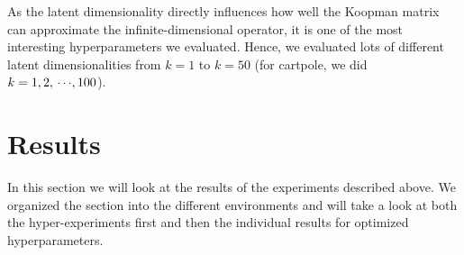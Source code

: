 			As the latent dimensionality directly influences how well the Koopman matrix can approximate the infinite-dimensional operator, it is one of the most interesting hyperparameters we evaluated. Hence, we evaluated lots of different latent dimensionalities from \( k = 1 \) to \( k = 50 \) (for cartpole, we did \( k = 1, 2, \,\cdots\!, 100 \)).

\section{Results}
	\label{sec:results}

	In this section we will look at the results of the experiments described above. We organized the section into the different environments and will take a look at both the hyper-experiments first and then the individual results for optimized hyperparameters.

